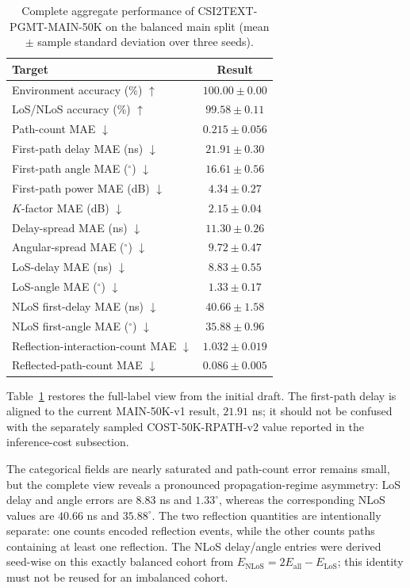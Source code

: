 \begin{table}[t]
\centering
\caption{Complete aggregate performance of CSI2TEXT-PGMT-MAIN-50K on the balanced main split
(mean $\pm$ sample standard deviation over three seeds).}
\label{tab:complete-main-fields}
\scriptsize
\setlength{\tabcolsep}{3pt}
\begin{tabular}{lc}
\toprule
Target & Result \\
\midrule
Environment accuracy (\%) $\uparrow$ & $100.00\pm0.00$ \\
LoS/NLoS accuracy (\%) $\uparrow$ & $99.58\pm0.11$ \\
Path-count MAE $\downarrow$ & $0.215\pm0.056$ \\
First-path delay MAE (ns) $\downarrow$ & $21.91\pm0.30$ \\
First-path angle MAE ($^\circ$) $\downarrow$ & $16.61\pm0.56$ \\
First-path power MAE (dB) $\downarrow$ & $4.34\pm0.27$ \\
$K$-factor MAE (dB) $\downarrow$ & $2.15\pm0.04$ \\
Delay-spread MAE (ns) $\downarrow$ & $11.30\pm0.26$ \\
Angular-spread MAE ($^\circ$) $\downarrow$ & $9.72\pm0.47$ \\
LoS-delay MAE (ns) $\downarrow$ & $8.83\pm0.55$ \\
LoS-angle MAE ($^\circ$) $\downarrow$ & $1.33\pm0.17$ \\
NLoS first-delay MAE (ns) $\downarrow$ & $40.66\pm1.58$ \\
NLoS first-angle MAE ($^\circ$) $\downarrow$ & $35.88\pm0.96$ \\
Reflection-interaction-count MAE $\downarrow$ & $1.032\pm0.019$ \\
Reflected-path-count MAE $\downarrow$ & $0.086\pm0.005$ \\
\bottomrule
\end{tabular}
\end{table}

Table~\ref{tab:complete-main-fields} restores the full-label view from the initial draft. The
first-path delay is aligned to the current MAIN-50K-v1 result, $21.91$ ns; it should not be confused
with the separately sampled COST-50K-RPATH-v2 value reported in the inference-cost subsection.

The categorical fields are nearly saturated and path-count error remains small, but the complete
view reveals a pronounced propagation-regime asymmetry: LoS delay and angle errors are
$8.83$ ns and $1.33^\circ$, whereas the corresponding NLoS values are $40.66$ ns and
$35.88^\circ$. The two reflection quantities are intentionally separate: one counts encoded
reflection events, while the other counts paths containing at least one reflection. The NLoS
delay/angle entries were derived seed-wise on this exactly balanced cohort from
$E_{\mathrm{NLoS}}=2E_{\mathrm{all}}-E_{\mathrm{LoS}}$; this identity must not be reused for an
imbalanced cohort.

